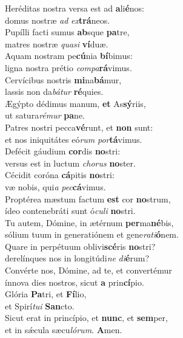 \evenverse Heréditas nostra versa est ad \textbf{a}li\textbf{é}nos:~\*\\
\evenverse domus nostræ \textit{ad} \textit{ex}\textbf{trá}neos.\\
\oddverse Pupílli facti sumus \textbf{ab}sque \textbf{pa}tre,~\*\\
\oddverse matres nostræ \textit{qua}\textit{si} \textbf{ví}duæ.\\
\evenverse Aquam nostram pe\textbf{cú}nia \textbf{bí}bimus:~\*\\
\evenverse ligna nostra prétio \textit{com}\textit{pa}\textbf{rá}vimus.\\
\oddverse Cervícibus nostris \textbf{mi}na\textbf{bá}mur,~\*\\
\oddverse lassis non da\textit{bá}\textit{tur} \textbf{ré}quies.\\
\evenverse Ægýpto dédimus manum, \textbf{et} As\textbf{sý}riis,~\*\\
\evenverse ut satura\textit{ré}\textit{mur} \textbf{pa}ne.\\
\oddverse Patres nostri pecca\textbf{vé}runt, et \textbf{non} sunt:~\*\\
\oddverse et nos iniquitátes eó\textit{rum} \textit{por}\textbf{tá}vimus.\\
\evenverse Defécit gáudium \textbf{cor}dis \textbf{no}stri:~\*\\
\evenverse versus est in luctum \textit{cho}\textit{rus} \textbf{no}ster.\\
\oddverse Cécidit coróna \textbf{cá}pitis \textbf{no}stri:~\*\\
\oddverse væ nobis, qui\textit{a} \textit{pec}\textbf{cá}vimus.\\
\evenverse Proptérea mæstum factum \textbf{est} cor \textbf{no}strum,~\*\\
\evenverse ídeo contenebráti sunt ó\textit{cu}\textit{li} \textbf{no}stri.\\
\oddverse Tu autem, Dómine, in ætérnum \textbf{per}ma\textbf{né}bis,~\*\\
\oddverse sólium tuum in generatiónem et gene\textit{ra}\textit{ti}\textbf{ó}nem.\\
\evenverse Quare in perpétuum oblivi\textbf{scé}ris \textbf{no}stri?~\*\\
\evenverse derelínques nos in longitúdi\textit{ne} \textit{di}\textbf{é}rum?\\
\oddverse Convérte nos, Dómine, ad te, et convertémur~\*\\
\oddverse ínnova dies nostros, sicut \textbf{a} prin\textbf{cí}pio.\\
\evenverse Glória \textbf{Pa}tri, et \textbf{Fí}lio,~\*\\
\evenverse et Spirí\textit{tu}\textit{i} \textbf{San}cto.\\
\oddverse Sicut erat in princípio, et \textbf{nunc}, et \textbf{sem}per,~\*\\
\oddverse et in sǽcula sæcu\textit{ló}\textit{rum}. \textbf{A}men.\\
